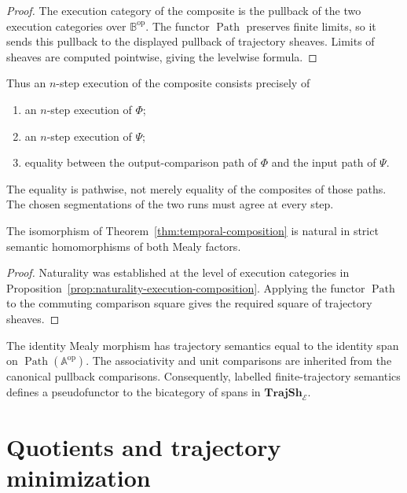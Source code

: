 \begin{proof}
The execution category of the composite is the pullback of the two execution
categories over \(\mathbb B^{\mathrm{op}}\). The functor
\(\operatorname{Path}\) preserves finite limits, so it sends this pullback
to the displayed pullback of trajectory sheaves. Limits of sheaves are
computed pointwise, giving the levelwise formula.
\end{proof}

Thus an \(n\)-step execution of the composite consists precisely of
\begin{enumerate}
    \item an \(n\)-step execution of \(\Phi\);
    \item an \(n\)-step execution of \(\Psi\);
    \item equality between the output-comparison path of \(\Phi\) and the
    input path of \(\Psi\).
\end{enumerate}
The equality is pathwise, not merely equality of the composites of those
paths. The chosen segmentations of the two runs must agree at every step.

\begin{proposition}
\label{prop:naturality-temporal-composition}
The isomorphism of
Theorem~\ref{thm:temporal-composition}
is natural in strict semantic homomorphisms of both Mealy factors.
\end{proposition}

\begin{proof}
Naturality was established at the level of execution categories in
Proposition~\ref{prop:naturality-execution-composition}. Applying the functor
\(\operatorname{Path}\) to the commuting comparison square gives the
required square of trajectory sheaves.
\end{proof}

The identity Mealy morphism has trajectory semantics equal to the identity
span on \(\operatorname{Path}(\mathbb A^{\mathrm{op}})\). The associativity
and unit comparisons are inherited from the canonical pullback comparisons.
Consequently, labelled finite-trajectory semantics defines a pseudofunctor to
the bicategory of spans in \(\mathbf{TrajSh}_{\mathcal E}\).

\section{Quotients and trajectory minimization}
\label{sec:temporal-quotients-minimization}

